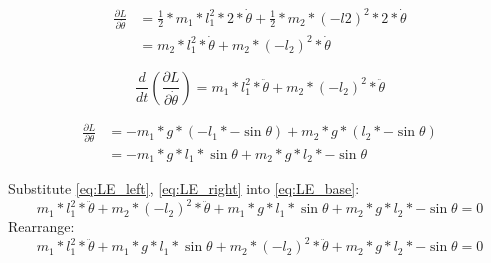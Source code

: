\documentclass[titlepage]{article}
\numberwithin{equation}{section}
\begin{document}
\bigskip
\begin{align}
\frac{\partial L}{\partial \dot{\theta}} &= \frac{1}{2} * m_1 * l_1^2 * 2 * \dot{\theta} + \frac{1}{2} * m_2 * (-l2)^2 * 2 * \dot{\theta} \\
&= m_2 * l_1^2 * \dot{\theta} + m_2 * (-l_2)^2 * \dot{\theta}
\end{align}

\bigskip
\begin{equation} \label{eq:LE_left}
\frac{d}{dt} \left(\frac{\partial L}{\partial \dot{\theta}}\right) = m_1 * l_1^2 * \ddot{\theta} + m_2 * (-l_2)^2 * \ddot{\theta}
\end{equation}

\bigskip
\begin{align} \label{eq:LE_right}
\frac{\partial L}{\partial \theta} &= -m_1 * g * (-l_1 * -\sin \theta) + m_2 * g * (l_2 * -\sin \theta) \\
&= -m_1 * g * l_1 * \sin \theta + m_2 * g * l_2 * -\sin \theta
\end{align}

\bigskip
\noindent
Substitute \ref{eq:LE_left}, \ref{eq:LE_right} into \ref{eq:LE_base}:
\begin{equation}
m_1 * l_1^2 * \ddot{\theta} + m_2 * (-l_2)^2 * \ddot{\theta} + m_1 * g * l_1 * \sin \theta + m_2 * g * l_2 * -\sin \theta = 0
\end{equation}
Rearrange:
\begin{equation}
m_1 * l_1^2 * \ddot{\theta} + m_1 * g * l_1 * \sin \theta + m_2 * (-l_2)^2 * \ddot{\theta} + m_2 * g * l_2 * -\sin \theta = 0
\end{equation}
\end{document}
